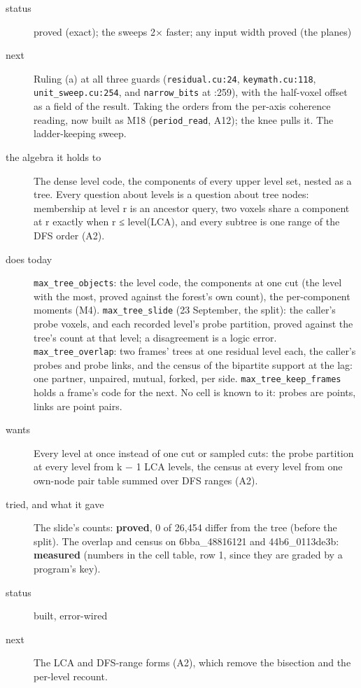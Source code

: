 \begin{description}
\item[{status}] proved (exact); the sweeps 2× faster; any input width proved (the planes)
\item[{next}] Ruling (a) at all three guards (\texttt{residual.\allowbreak{}cu:24}, \texttt{keymath.\allowbreak{}cu:118}, \texttt{unit\_\allowbreak{}sweep.\allowbreak{}cu:254}, and \texttt{narrow\_\allowbreak{}bits} at :259), with the half-voxel offset as a field of the result. Taking the orders from the per-axis coherence reading, now built as M18 (\texttt{period\_\allowbreak{}read}, A12); the knee pulls it. The ladder-keeping sweep.
\end{description}

\begin{description}
\item[{the algebra it holds to}] The dense level code, the components of every upper level set, nested as a tree. Every question about levels is a question about tree nodes: membership at level r is an ancestor query, two voxels share a component at r exactly when r ≤ level(LCA), and every subtree is one range of the DFS order (A2).
\item[{does today}] \texttt{max\_\allowbreak{}tree\_\allowbreak{}objects}: the level code, the components at one cut (the level with the most, proved against the forest's own count), the per-component moments (M4). \texttt{max\_\allowbreak{}tree\_\allowbreak{}slide} (23 September, the split): the caller's probe voxels, and each recorded level's probe partition, proved against the tree's count at that level; a disagreement is a logic error. \texttt{max\_\allowbreak{}tree\_\allowbreak{}overlap}: two frames' trees at one residual level each, the caller's probes and probe links, and the census of the bipartite support at the lag: one partner, unpaired, mutual, forked, per side. \texttt{max\_\allowbreak{}tree\_\allowbreak{}keep\_\allowbreak{}frames} holds a frame's code for the next. No cell is known to it: probes are points, links are point pairs.
\item[{wants}] Every level at once instead of one cut or sampled cuts: the probe partition at every level from k − 1 LCA levels, the census at every level from one own-node pair table summed over DFS ranges (A2).
\item[{tried, and what it gave}] The slide's counts: \textbf{proved}, 0 of 26,454 differ from the tree (before the split). The overlap and census on 6bba\_\allowbreak{}48816121 and 44b6\_\allowbreak{}0113de3b: \textbf{measured} (numbers in the cell table, row 1, since they are graded by a program's key).
\item[{status}] built, error-wired
\item[{next}] The LCA and DFS-range forms (A2), which remove the bisection and the per-level recount.
\end{description}


